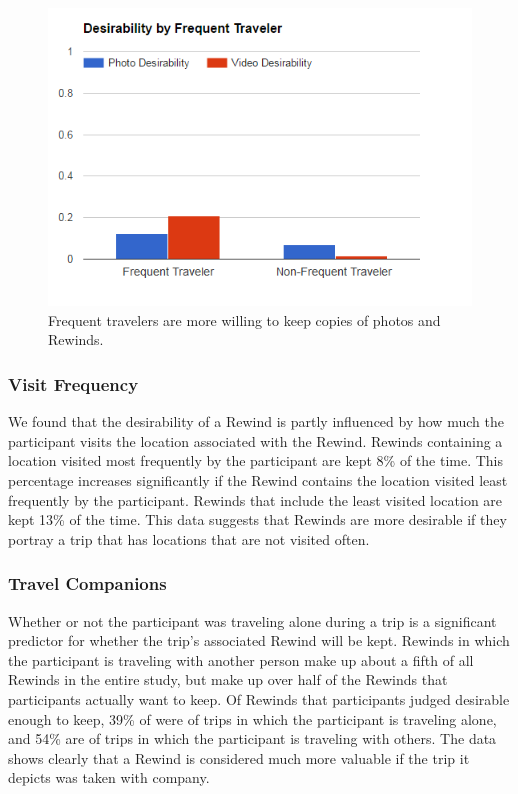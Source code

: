 \documentclass{sigchi}
\begin{document}
\begin{figure}
   \centering
     \includegraphics[width=1\linewidth]{FreqTraveler_keep_2}
     \caption{Frequent travelers are more willing to keep copies of photos and Rewinds.}
     \label{fig:frequencydesire}
\end{figure}

\subsubsection{Visit Frequency}
We found that the desirability of a Rewind is partly influenced by how much the participant visits the location associated with the Rewind. Rewinds containing a location visited most frequently by the participant are kept 8\% of the time. This percentage increases significantly if the Rewind contains the location visited least frequently by the participant. Rewinds that include the least visited location are kept 13\% of the time. This data suggests that Rewinds are more desirable if they portray a trip that has locations that are not visited often.

\subsubsection{Travel Companions}
Whether or not the participant was traveling alone during a trip is a significant predictor for whether the trip's associated Rewind will be kept. Rewinds in which the participant is traveling with another person make up about a fifth of all Rewinds in the entire study, but make up over half of the Rewinds that participants actually want to keep. Of Rewinds that participants judged desirable enough to keep, 39\% of were of trips in which the participant is traveling alone, and 54\% are of trips in which the participant is traveling with others. The data shows clearly that a Rewind is considered much more valuable if the trip it depicts was taken with company. 
\end{document}
